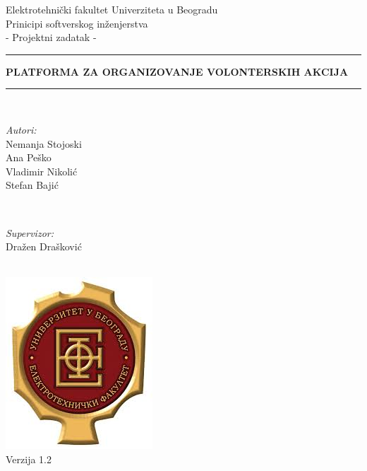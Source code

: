\documentclass[11pt,a4paper]{article}
\begin{document}
\begin{titlepage}

\centering
\textnormal{\large Elektrotehnički fakultet Univerziteta u Beogradu}\\[0.1cm]
\textnormal{\large Prinicipi softverskog inženjerstva}\\[2cm]

\textnormal{\normalsize - Projektni zadatak -}\\\vspace{-5mm}
\rule{\textwidth}{0.4pt}
{\Huge \bfseries PLATFORMA ZA ORGANIZOVANJE VOLONTERSKIH AKCIJA \par}
\rule{\textwidth}{0.4pt}\\\vspace{5mm}

\begin{minipage}{0.4\textwidth}
\begin{flushleft} \large
\emph{Autori:}\\
Nemanja Stojoski\\
Ana Peško\\
Vladimir Nikolić\\
Stefan Bajić
\end{flushleft}
\end{minipage}
~
\begin{minipage}{0.4\textwidth}
\begin{flushright} \large
\emph{Supervizor:} \\
Dražen Drašković
\end{flushright}
\end{minipage}\\[4cm]
\includegraphics[scale=0.5]{logo.jpg}\\
\vfill
\textnormal{\normalsize Verzija 1.2}\\

\end{titlepage}
\end{document}
